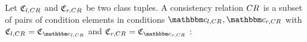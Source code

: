 \begin{definition}
\label{def:consistencyrelation}
    Let $\classtuple{C}{l,\consistencyrelation{CR}{}}$ and $\classtuple{C}{r,\consistencyrelation{CR}{}}$ be two class tuples.
    A consistency relation $\consistencyrelation{CR}{}$ is a subset of pairs of condition elements in conditions $\condition{c}{l,\consistencyrelation{CR}{}}, \condition{c}{r,\consistencyrelation{CR}{}}$ with
    $\classtuple{C}{l,\consistencyrelation{CR}{}} = \classtuple{C}{\condition{c}{l,\consistencyrelation{CR}{}}}$ and $\classtuple{C}{r,\consistencyrelation{CR}{}} = \classtuple{C}{\condition{c}{r,\consistencyrelation{CR}{}}}$ :

\end{definition}
